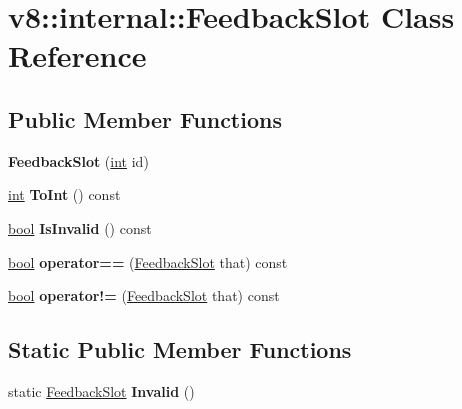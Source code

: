 \hypertarget{classv8_1_1internal_1_1FeedbackSlot}{}\section{v8\+:\+:internal\+:\+:Feedback\+Slot Class Reference}
\label{classv8_1_1internal_1_1FeedbackSlot}
\subsection*{Public Member Functions}
\begin{DoxyCompactItemize}
\item 
\mbox{\label{classv8_1_1internal_1_1FeedbackSlot_a0f0624606dca9453223556869b09cfa1}} 
{\bfseries Feedback\+Slot} (\mbox{\hyperlink{classint}{int}} id)
\item 
\mbox{\label{classv8_1_1internal_1_1FeedbackSlot_a78cb346d339e9f56294b5406e0f75015}} 
\mbox{\hyperlink{classint}{int}} {\bfseries To\+Int} () const
\item 
\mbox{\label{classv8_1_1internal_1_1FeedbackSlot_a03989b758b18c4089f31de2c5346af3c}} 
\mbox{\hyperlink{classbool}{bool}} {\bfseries Is\+Invalid} () const
\item 
\mbox{\label{classv8_1_1internal_1_1FeedbackSlot_a8f60812d1101a2fde0f18282e6547ab3}} 
\mbox{\hyperlink{classbool}{bool}} {\bfseries operator==} (\mbox{\hyperlink{classv8_1_1internal_1_1FeedbackSlot}{Feedback\+Slot}} that) const
\item 
\mbox{\label{classv8_1_1internal_1_1FeedbackSlot_a1d93b846e281d52ddd30959ac044c81e}} 
\mbox{\hyperlink{classbool}{bool}} {\bfseries operator!=} (\mbox{\hyperlink{classv8_1_1internal_1_1FeedbackSlot}{Feedback\+Slot}} that) const
\end{DoxyCompactItemize}
\subsection*{Static Public Member Functions}
\begin{DoxyCompactItemize}
\item 
\mbox{\label{classv8_1_1internal_1_1FeedbackSlot_aa93b4fef3f33a3c0c6e4b0d3d51069b2}} 
static \mbox{\hyperlink{classv8_1_1internal_1_1FeedbackSlot}{Feedback\+Slot}} {\bfseries Invalid} ()
\end{DoxyCompactItemize}
